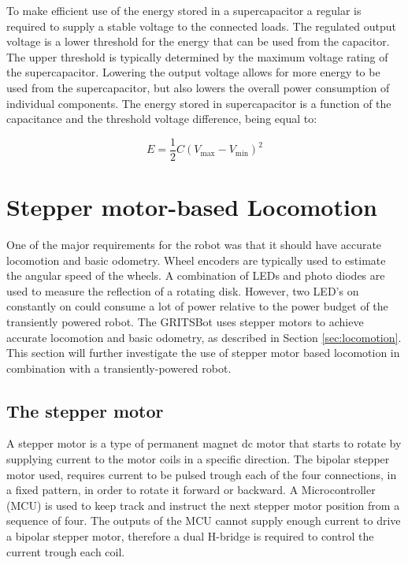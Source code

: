 To make efficient use of the energy stored in a supercapacitor a regular is required to supply a stable voltage to the connected loads.
The regulated output voltage is a lower threshold for the energy that can be used from the capacitor.
The upper threshold is typically determined by the maximum voltage rating of the supercapacitor.
Lowering the output voltage allows for more energy to be used from the supercapacitor, but also lowers the overall power consumption of individual components.
The energy stored in supercapacitor is a function of the capacitance and the threshold voltage difference, being equal to:

\begin{equation}
\label{eq:cap2}
E = \frac{1}{2}C(V_{\max} - V_{\min})^{2}
\end{equation}

\section{Stepper motor-based Locomotion}

One of the major requirements for the robot was that it should have accurate locomotion and basic odometry.
Wheel encoders are typically used to estimate the angular speed of the wheels.
A combination of LEDs and photo diodes are used to measure the reflection of a rotating disk.
However, two LED's on constantly on could consume a lot of power relative to the power budget of the transiently powered robot.
The GRITSBot uses stepper motors to achieve accurate locomotion and basic odometry, as described in Section \ref{sec:locomotion}.
This section will further investigate the use of stepper motor based locomotion in combination with a transiently-powered robot.

\subsection{The stepper motor}
A stepper motor is a type of permanent magnet dc motor that starts to rotate by supplying current to the motor coils in a specific direction.
The bipolar stepper motor used, requires current to be pulsed trough each of the four connections, in a fixed pattern, in order to rotate it forward or backward.
A Microcontroller (MCU) is used to keep track and instruct the next stepper motor position from a sequence of four.
The outputs of the MCU cannot supply enough current to drive a bipolar stepper motor, therefore a dual H-bridge is required to control the current trough each coil.

